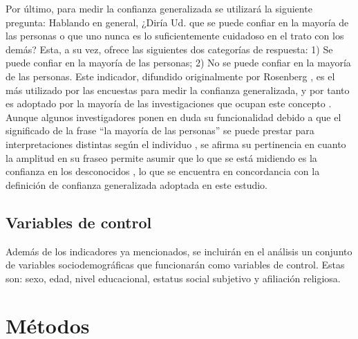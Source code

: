 \documentclass[12pt,twoside]{templates/facsothesis}
\begin{document}
Por último, para medir la confianza generalizada se utilizará la siguiente pregunta: Hablando en general, ¿Diría Ud. que se puede confiar en la mayoría de las personas o que uno nunca es lo suficientemente cuidadoso en el trato con los demás? Esta, a su vez, ofrece las siguientes dos categorías de respuesta: 1) Se puede confiar en la mayoría de las personas; 2) No se puede confiar en la mayoría de las personas. Este indicador, difundido originalmente por Rosenberg \citeyearpar{rosenbergMisanthropyPoliticalIdeology1956}, es el más utilizado por las encuestas para medir la confianza generalizada, y por tanto es adoptado por la mayoría de las investigaciones que ocupan este concepto \citep{andrianiInstitutionalTrustCorruption2021, garcia-sanchezEconomicInequalityUnfairness2025a, mattesSocialPoliticalTrust2018, newtonThreeFormsTrust2011, oskarssonGeneralizedTrustPolitical2010}. Aunque algunos investigadores ponen en duda su funcionalidad debido a que el significado de la frase ``la mayoría de las personas'' se puede prestar para interpretaciones distintas según el individuo \citep{justwanMeasuringSocialTrust2018}, se afirma su pertinencia en cuanto la amplitud en su fraseo permite asumir que lo que se está midiendo es la confianza en los desconocidos \citep{oskarssonGeneralizedTrustPolitical2010, uslanerMoralFoundationsTrust2002}, lo que se encuentra en concordancia con la definición de confianza generalizada adoptada en este estudio.

\subsection{Variables de control}\label{variables-de-control}

Además de los indicadores ya mencionados, se incluirán en el análisis un conjunto de variables sociodemográficas que funcionarán como variables de control. Estas son: sexo, edad, nivel educacional, estatus social subjetivo y afiliación religiosa.

\section{Métodos}\label{muxe9todos}
\end{document}
